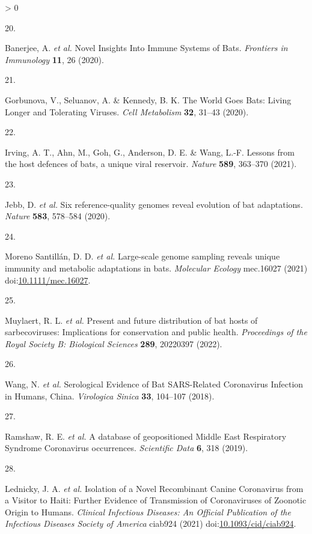 \documentclass[11pt]{article}
\newlength{\cslhangindent}
\newlength{\csllabelwidth}
\newenvironment{CSLReferences}[3] %
 {%
  \setlength{\parindent}{0pt}
  \ifodd #1 \everypar{\setlength{\hangindent}{\cslhangindent}}\ignorespaces\fi
  \ifnum #2 > 0
  \setlength{\parskip}{#2\baselineskip}
  \fi
 }%
 {}
\newcommand{\CSLLeftMargin}[1]{\parbox[t]{\maxof{\widthof{#1}}{\csllabelwidth}}{#1}}
\newcommand{\CSLRightInline}[1]{\parbox[t]{\linewidth}{#1}}
\begin{document}
\begin{CSLReferences}{0}{0}
\leavevmode\hypertarget{ref-Banerjee2020NovIns}{}%
\CSLLeftMargin{20. }
\CSLRightInline{Banerjee, A. \emph{et al.} Novel Insights Into Immune
Systems of Bats. \emph{Frontiers in Immunology} \textbf{11}, 26 (2020).}

\leavevmode\hypertarget{ref-Gorbunova2020WorGoe}{}%
\CSLLeftMargin{21. }
\CSLRightInline{Gorbunova, V., Seluanov, A. \& Kennedy, B. K. The World
Goes Bats: Living Longer and Tolerating Viruses. \emph{Cell Metabolism}
\textbf{32}, 31--43 (2020).}

\leavevmode\hypertarget{ref-Irving2021LesHos}{}%
\CSLLeftMargin{22. }
\CSLRightInline{Irving, A. T., Ahn, M., Goh, G., Anderson, D. E. \&
Wang, L.-F. Lessons from the host defences of bats, a unique viral
reservoir. \emph{Nature} \textbf{589}, 363--370 (2021).}

\leavevmode\hypertarget{ref-Jebb2020SixRef}{}%
\CSLLeftMargin{23. }
\CSLRightInline{Jebb, D. \emph{et al.} Six reference-quality genomes
reveal evolution of bat adaptations. \emph{Nature} \textbf{583},
578--584 (2020).}

\leavevmode\hypertarget{ref-MorenoSantillan2021LarGen}{}%
\CSLLeftMargin{24. }
\CSLRightInline{Moreno Santillán, D. D. \emph{et al.} Large-scale genome
sampling reveals unique immunity and metabolic adaptations in bats.
\emph{Molecular Ecology} mec.16027 (2021)
doi:\href{https://doi.org/10.1111/mec.16027}{10.1111/mec.16027}.}

\leavevmode\hypertarget{ref-Muylaert2022PreFut}{}%
\CSLLeftMargin{25. }
\CSLRightInline{Muylaert, R. L. \emph{et al.} Present and future
distribution of bat hosts of sarbecoviruses: Implications for
conservation and public health. \emph{Proceedings of the Royal Society
B: Biological Sciences} \textbf{289}, 20220397 (2022).}

\leavevmode\hypertarget{ref-Wang2018SerEvi}{}%
\CSLLeftMargin{26. }
\CSLRightInline{Wang, N. \emph{et al.} Serological Evidence of Bat
SARS-Related Coronavirus Infection in Humans, China. \emph{Virologica
Sinica} \textbf{33}, 104--107 (2018).}

\leavevmode\hypertarget{ref-Ramshaw2019DatGeo}{}%
\CSLLeftMargin{27. }
\CSLRightInline{Ramshaw, R. E. \emph{et al.} A database of geopositioned
Middle East Respiratory Syndrome Coronavirus occurrences.
\emph{Scientific Data} \textbf{6}, 318 (2019).}

\leavevmode\hypertarget{ref-Lednicky2021IsoNov}{}%
\CSLLeftMargin{28. }
\CSLRightInline{Lednicky, J. A. \emph{et al.} Isolation of a Novel
Recombinant Canine Coronavirus from a Visitor to Haiti: Further Evidence
of Transmission of Coronaviruses of Zoonotic Origin to Humans.
\emph{Clinical Infectious Diseases: An Official Publication of the
Infectious Diseases Society of America} ciab924 (2021)
doi:\href{https://doi.org/10.1093/cid/ciab924}{10.1093/cid/ciab924}.}


\end{CSLReferences}
\end{document}
